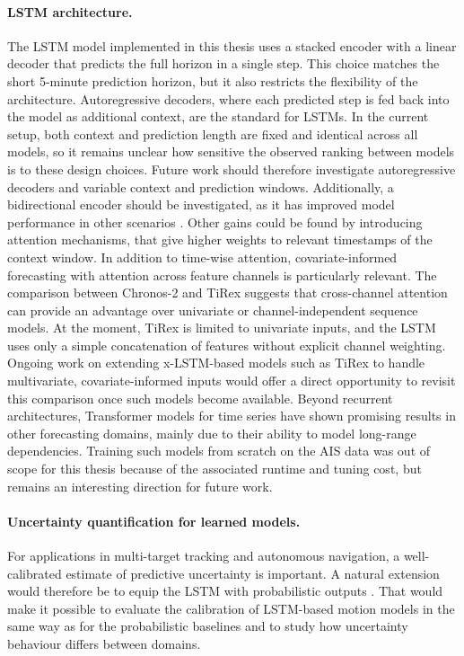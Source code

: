 \paragraph{LSTM architecture.}
The LSTM model implemented in this thesis uses a stacked encoder with a linear decoder that predicts the full horizon in a single step. This choice matches the short 5-minute prediction horizon, but it also restricts the flexibility of the architecture. Autoregressive decoders, where each predicted step is fed back into the model as additional context, are the standard for \acp{LSTM}. In the current setup, both context and prediction length are fixed and identical across all models, so it remains unclear how sensitive the observed ranking between models is to these design choices. Future work should therefore investigate autoregressive decoders and variable context and prediction windows.
Additionally, a bidirectional encoder should be investigated, as it has improved model performance in other scenarios \parencite{articlebilstmsus}. Other gains could be found by introducing attention mechanisms, that give higher weights to relevant timestamps of the context window. 
In addition to time-wise attention, covariate-informed forecasting with attention across feature channels is particularly relevant. The comparison between Chronos-2 and TiRex suggests that cross-channel attention can provide an advantage over univariate or channel-independent sequence models. At the moment, TiRex is limited to univariate inputs, and the LSTM uses only a simple concatenation of features without explicit channel weighting. Ongoing work on extending x-LSTM-based models such as TiRex to handle multivariate, covariate-informed inputs would offer a direct opportunity to revisit this comparison once such models become available. Beyond recurrent architectures, Transformer models for time series have shown promising results in other forecasting domains, mainly due to their ability to model long-range dependencies. Training such models from scratch on the AIS data was out of scope for this thesis because of the associated runtime and tuning cost, but remains an interesting direction for future work. 

\paragraph{Uncertainty quantification for learned models.}
 For applications in multi-target tracking and autonomous navigation, a well-calibrated estimate of predictive uncertainty is important. A natural extension would therefore be to equip the LSTM with probabilistic outputs%
 . That would make it possible to evaluate the calibration of LSTM-based motion models in the same way as for the probabilistic baselines and to study how uncertainty behaviour differs between domains.

